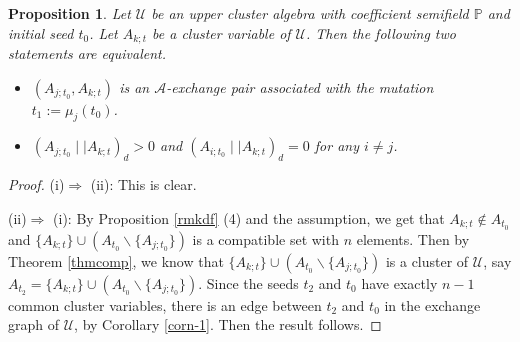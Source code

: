 \documentclass{amsart}
\newtheorem{proposition}[theorem]{Proposition}
\theoremstyle{definition}
\theoremstyle{remark}
\numberwithin{equation}{section}
\begin{document}
\begin{proposition}\label{lemdex}
Let $\mathcal U$ be an upper cluster algebra with coefficient semifield $\mathbb P$ and initial seed $t_0$.
Let  $A_{k;t}$ be a cluster variable of $\mathcal U$. Then the following two statements are equivalent.
\begin{itemize}
\item[(i)] $(A_{j;t_0},A_{k;t})$ is an $\mathscr A$-exchange pair associated with the mutation $t_1:=\mu_j(t_0)$.

\item[(ii)] $(A_{j;t_0}\mid\mid  A_{k;t})_d>0$ and $(A_{i;t_0}\mid\mid  A_{k;t})_d=0$ for any $i\neq j$.
\end{itemize}
\end{proposition}
\begin{proof}
(i)$\Longrightarrow$ (ii): This is clear.

(ii)$\Longrightarrow$ (i): By Proposition \ref{rmkdf} (4) and the assumption, we get that $A_{k;t}\notin A_{t_0}$ and  $\{A_{k;t}\}\cup(A_{t_0}\backslash\{A_{j;t_0}\})$ is a compatible set with $n$ elements.
Then by Theorem \ref{thmcomp}, we know that $\{A_{k;t}\}\cup(A_{t_0}\backslash\{A_{j;t_0}\})$ is a cluster of $\mathcal U$, say $A_{t_2}=\{A_{k;t}\}\cup(A _{t_0}\backslash\{A_{j;t_0}\})$. Since the seeds $t_2$ and $t_0$ have exactly $n-1$ common cluster variables,  there is an edge between $t_2$ and $t_0$ in the exchange graph of $\mathcal U$, by Corollary \ref{corn-1}. Then the result follows.
\end{proof}
\end{document}
